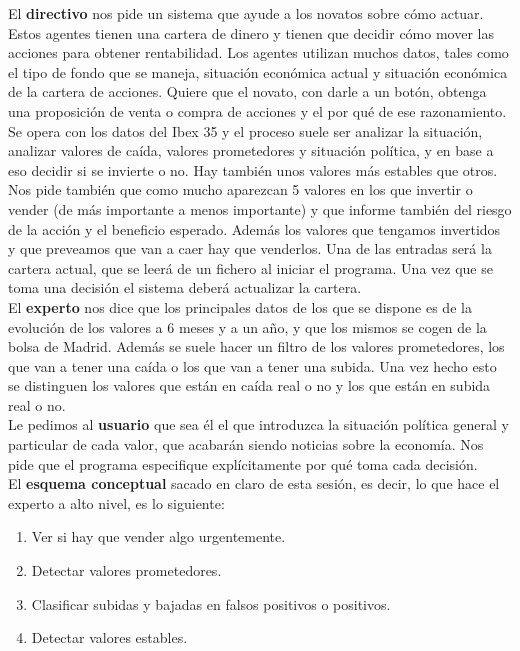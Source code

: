 \documentclass[12pt]{article}
\begin{document}
El \textbf{directivo} nos pide un sistema que ayude a los novatos sobre cómo actuar. Estos agentes tienen una cartera de dinero y tienen que decidir cómo mover las acciones para obtener rentabilidad. Los agentes utilizan muchos datos, tales como el tipo de fondo que se maneja, situación económica actual y situación económica de la cartera de acciones. Quiere que el novato, con darle a un botón, obtenga una proposición de venta o compra de acciones y el por qué de ese razonamiento. Se opera con los datos del Ibex 35 y el proceso suele ser analizar la situación, analizar valores de caída, valores prometedores y situación política, y en base a eso decidir si se invierte o no. Hay también unos valores más estables que otros. Nos pide también que como mucho aparezcan 5 valores en los que invertir o vender (de más importante a menos importante) y que informe también del riesgo de la acción y el beneficio esperado. Además los valores que tengamos invertidos y que preveamos que van a caer hay que venderlos. Una de las entradas será la cartera actual, que se leerá de un fichero al iniciar el programa. Una vez que se toma una decisión el sistema deberá actualizar la cartera.\\

El \textbf{experto} nos dice que los principales datos de los que se dispone es de la evolución de los valores a 6 meses y a un año, y que los mismos se cogen de la bolsa de Madrid. Además se suele hacer un filtro de los valores prometedores, los que van a tener una caída o los que van a tener una subida. Una vez hecho esto se distinguen los valores que están en caída real o no y los que están en subida real o no.\\

Le pedimos al \textbf{usuario} que sea él el que introduzca la situación política general y particular de cada valor, que acabarán siendo noticias sobre la economía. Nos pide que el programa especifique explícitamente por qué toma cada decisión.\\

El \textbf{esquema conceptual} sacado en claro de esta sesión, es decir, lo que hace el experto a alto nivel, es lo siguiente:
\begin{enumerate}
\item Ver si hay que vender algo urgentemente.
\item Detectar valores prometedores.
\item Clasificar subidas y bajadas en falsos positivos o positivos.
\item Detectar valores estables.
\end{enumerate}
\end{document}
